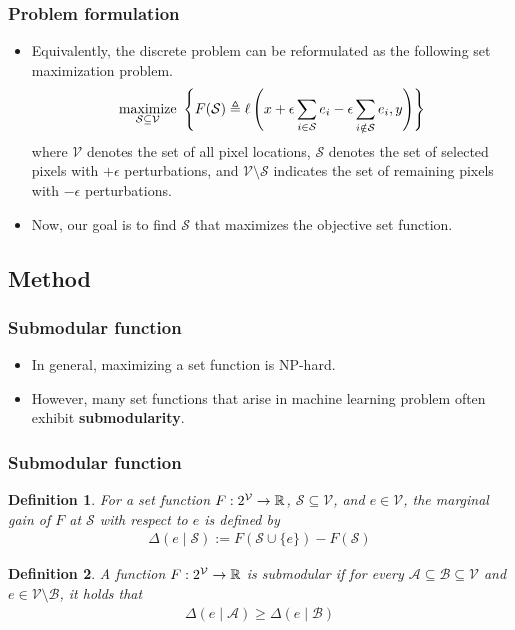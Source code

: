 \documentclass[10pt,mathserif]{beamer}
\newtheorem{defn}{Definition}
\begin{document}
\begin{frame}
\frametitle{Problem formulation}
\begin{itemize}\itemsep=20pt
\item Equivalently, the discrete problem can be reformulated as the following set maximization problem.
\begin{align*}
\operatorname*{maximize}_{\mathcal{S} \subseteq \mathcal{V}}~ \left\{ F(\mathcal{S}) \triangleq \ell \left(x + \epsilon \sum_{i \in \mathcal{S}}e_i - \epsilon \sum_{i \notin \mathcal{S}}e_i, y \right) \right\}
\end{align*}
where $\mathcal{V}$ denotes the set of all pixel locations, $\mathcal{S}$ denotes the set of selected pixels with $+\epsilon$ perturbations, and $\mathcal{V} \setminus \mathcal{S}$ indicates the set of remaining pixels with $-\epsilon$ perturbations. \pause
\item Now, our goal is to find $\mathcal{S}$ that maximizes the objective set function.
\end{itemize}
\end{frame}

\subsection{Method}

\begin{frame}
\frametitle{Submodular function}
\begin{itemize}\itemsep=25pt
\item In general, maximizing a set function is NP-hard.\pause
\item However, many set functions that arise in machine learning problem often exhibit \textbf{submodularity}.
\end{itemize}
\end{frame}

\begin{frame}
\frametitle{Submodular function}
\begin{defn}
For a set function $F:2^{\mathcal{V}} \rightarrow \mathbb R$, $\mathcal{S} \subseteq \mathcal{V}$, and $e \in \mathcal{V}$, the marginal gain of $F$ at $\mathcal{S}$ with respect to $e$ is defined by
\begin{align*}
\Delta(e \mid \mathcal{S}) := F(\mathcal{S}\cup\{e\})-F(\mathcal{S})
\end{align*}
\end{defn}
\begin{defn}
A function $F:2^{\mathcal{V}} \rightarrow \mathbb R$ is submodular if for every $\mathcal{A} \subseteq \mathcal{B} \subseteq \mathcal{V}$ and $e \in \mathcal{V} \setminus \mathcal{B}$, it holds that
\begin{align*}
\Delta(e \mid \mathcal{A}) \geq \Delta(e \mid \mathcal{B})
\end{align*}
\end{defn}
\end{frame}
\end{document}
